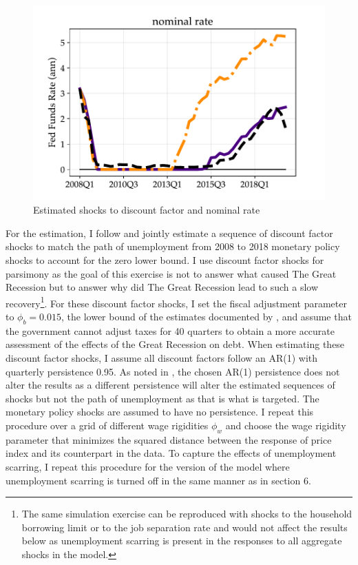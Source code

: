 \begin{figure}[H]
\begin{center}
\begin{minipage}{0.5\textwidth}
\end{minipage}\hspace*{\fill}
\begin{minipage}{0.5\textwidth}
\includegraphics[scale=.5]{text/chapter1/Figures/GR_sim/FedFunds}
\end{minipage}
\caption{Estimated shocks to discount factor and nominal rate} 
\label{Estimatedshks}
\end{center}
\end{figure}


For the estimation, I follow \cite{kekre2023} and jointly estimate a sequence of discount factor shocks to match the path of unemployment from 2008 to 2018 monetary policy shocks to account for the zero lower bound. I use discount factor shocks for parsimony as the goal of this exercise is not to answer what caused The Great Recession but to answer why did The Great Recession lead to such a slow recovery\footnote{The same simulation exercise can be reproduced with shocks to the household borrowing limit or to the job separation rate and would not affect the results below as unemployment scarring is present in the responses to all aggregate shocks in the model.}. For these discount factor shocks, I set the fiscal adjustment parameter to $\phi_{b} = 0.015$, the lower bound of the estimates documented by  \cite{AuclertMicroJumpsMacroHumps}, and assume that the government cannot adjust taxes for 40 quarters to obtain a more accurate assessment of the effects of the Great Recession on debt. When estimating these discount factor shocks, I assume all discount factors follow an AR(1) with quarterly persistence 0.95. As noted in \cite{kekre2023}, the chosen AR(1) persistence does not alter the results as a different persistence will alter the estimated sequences of shocks but not the path of unemployment as that is what is targeted. The monetary policy shocks are assumed to have no persistence. I repeat this procedure over a grid of different wage rigidities $\phi_{w}$ and choose the wage rigidity parameter that minimizes the squared distance between the response of price index and its counterpart in the data. To capture the effects of unemployment scarring, I repeat this procedure for the version of the model where unemployment scarring is turned off in the same manner as in section 6. 


